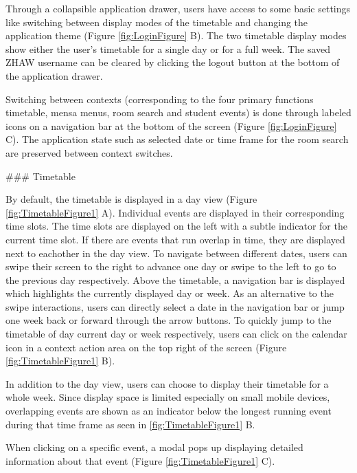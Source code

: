 \begin{markdown}
Through a collapsible application drawer, users have access to some basic settings like switching between display modes of the timetable and changing the application theme (Figure \ref{fig:LoginFigure} B). The two timetable display modes show either the user's timetable for a single day or for a full week. The saved ZHAW username can be cleared by clicking the logout button at the bottom of the application drawer.

Switching between contexts (corresponding to the four primary functions timetable, mensa menus, room search and student events) is done through labeled icons on a navigation bar at the bottom of the screen (Figure \ref{fig:LoginFigure} C). The application state such as selected date or time frame for the room search are preserved between context switches.

### Timetable

By default, the timetable is displayed in a day view (Figure \ref{fig:TimetableFigure1} A). Individual events are displayed in their corresponding time slots. The time slots are displayed on the left with a subtle indicator for the current time slot. If there are events that run overlap in time, they are displayed next to eachother in the day view. To navigate between different dates, users can swipe their screen to the right to advance one day or swipe to the left to go to the previous day respectively. Above the timetable, a navigation bar is displayed which highlights the currently displayed day or week. As an alternative to the swipe interactions, users can directly select a date in the navigation bar or jump one week back or forward through the arrow buttons. To quickly jump to the timetable of day current day or week respectively, users can click on the calendar icon in a context action area on the top right of the screen (Figure \ref{fig:TimetableFigure1} B).

In addition to the day view, users can choose to display their timetable for a whole week. Since display space is limited especially on small mobile devices, overlapping events are shown as an indicator below the longest running event during that time frame as seen in \ref{fig:TimetableFigure1} B.

When clicking on a specific event, a modal pops up displaying detailed information about that event (Figure \ref{fig:TimetableFigure1} C).


\end{markdown}
